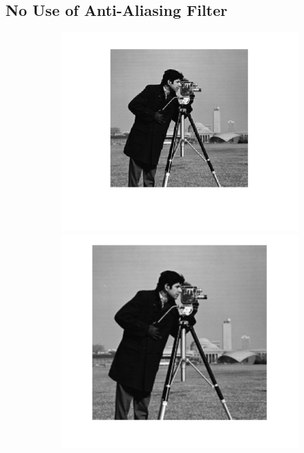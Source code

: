\documentclass{article}
\begin{document}
\subsection*{No Use of Anti-Aliasing Filter}
\begin{figure}[h!]
	\centering
	\begin{subfigure}[t]{0.3\textwidth}
		\centering
		\includegraphics[width=\linewidth]{./output_images/DOWN_no_anti-alias_cubic_scale_0_500000.png}
		\includegraphics[width=\linewidth]{./output_images/UP_no_anti-alias_cubic_scale_0_500000.png}

\end{subfigure}
\end{figure}
\end{document}
